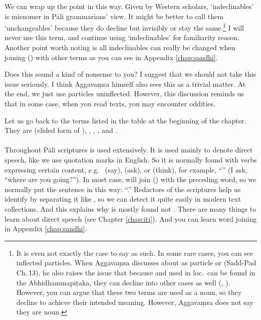 We can wrap up the point in this way. Given by Western scholars, `indeclinables' is misnomer in P\=ali grammarians' view. It might be better to call them `unchangeables' because they do decline but invisibly or stay the same.\footnote{It is even not exactly the case to say as such. In some rare cases, you can see inflected particles. When Aggava\d msa discusses about  as particle or  (Sadd-Pad Ch.\,13), he also raises the issue that because  and  used in loc.\ can be found in the Abhidhammapi\d taka, they can decline into other cases as well (, \citealp[p.~300]{smith:sadd1}). However, you can argue that these two terms are used as a noun, so they decline to achieve their intended meaning. However, Aggava\d msa does not say they are noun.} I will never use this term, and continue using `indeclinables' for familiarity reason. Another point worth noting is all indeclinables can really be changed when joining () with other terms as you can see in Appendix \ref{chap:sandhi}. 

Does this sound a kind of nonsense to you? I suggest that we should not take this issue seriously. I think Aggava\d msa himself also sees this as a trivial matter. At the end, we just use particles uninflected. However, this discussion reminds us that in some case, when you read texts, you may encounter oddities.

\bigskip
Let us go back to the terms listed in the table at the beginning of the chapter. They are  (elided form of ), , , , and .

\paragraph*{} Throughout P\=ali scriptures  is used extensively. It is used mainly to denote direct speech, like we use quotation marks in English. So it is normally found with verbs expressing certain content, e.g.\  (say),  (ask), or  (think), for example, ``'' (I ask, ``where are you going?''). In most case,  will join () with the preceding word, so we normally put the sentence in this way: ``.'' Redactors of the scriptures help us identify  by separating it like , so we can detect it quite easily in modern text collections. And this explains why  is mostly found not . There are many things to learn about direct speech (see Chapter \ref{chap:iti}). And you can learn word joining  in Appendix \ref{chap:sandhi}.


